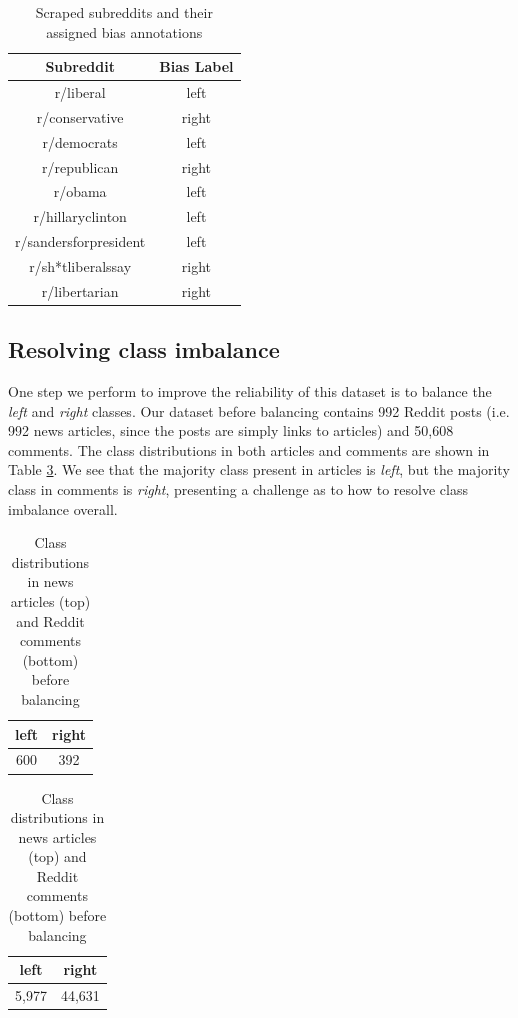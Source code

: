 \begin{table}[ht]
    \centering
    \begin{tabular}{|c|c|}
        \hline
        \textbf{Subreddit} & \textbf{Bias Label} \\
        \hline
        r/liberal & left \\
        r/conservative & right \\
        r/democrats & left \\
        r/republican & right \\
        r/obama & left \\
        r/hillaryclinton & left \\
        r/sandersforpresident & left \\
        r/sh*tliberalssay & right \\
        r/libertarian & right \\
        \hline
    \end{tabular}
    \caption{Scraped subreddits and their assigned bias annotations}
    \label{tab:subreddit-list}
\end{table}

\subsection{Resolving class imbalance}

One step we perform to improve the reliability of this dataset is to balance the \textit{left} and \textit{right} classes. Our dataset before balancing contains 992 Reddit posts (i.e. 992 news articles, since the posts are simply links to articles) and 50,608 comments. The class distributions in both articles and comments are shown in Table \ref{tab:reddit-classes-before-balancing}. We see that the majority class present in articles is \textit{left}, but the majority class in comments is \textit{right}, presenting a challenge as to how to resolve class imbalance overall.

\begin{table}[ht]
    \begin{center}
        \begin{tabular}{|c|c|}
            \hline
            left & right \\
            \hline
            600 & 392 \\
            \hline
        \end{tabular}
    \end{center} \vspace{5pt}
    \begin{center}
        \begin{tabular}{|c|c|}
            \hline
            left & right \\
            \hline
            5,977 & 44,631 \\
            \hline
        \end{tabular}
    \end{center}
    \caption{Class distributions in news articles (top) and Reddit comments (bottom) before balancing}
    \label{tab:reddit-classes-before-balancing}
\end{table}

